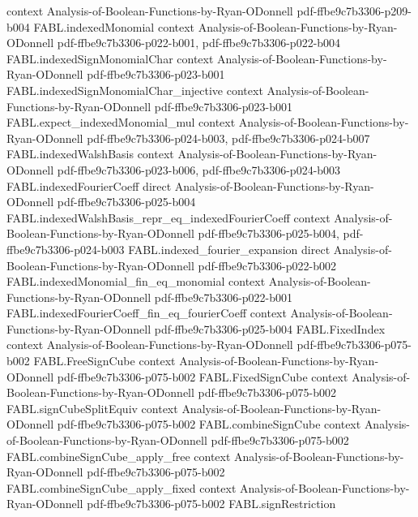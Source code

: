 \begin{theorem}
  {context}
  {Analysis-of-Boolean-Functions-by-Ryan-ODonnell}
  {pdf-ffbe9c7b3306-p209-b004}
\proofstep
  {FABL.indexedMonomial}
  {context}
  {Analysis-of-Boolean-Functions-by-Ryan-ODonnell}
  {pdf-ffbe9c7b3306-p022-b001,
    pdf-ffbe9c7b3306-p022-b004}
\proofstep
  {FABL.indexedSignMonomialChar}
  {context}
  {Analysis-of-Boolean-Functions-by-Ryan-ODonnell}
  {pdf-ffbe9c7b3306-p023-b001}
\proofstep
  {FABL.indexedSignMonomialChar_injective}
  {context}
  {Analysis-of-Boolean-Functions-by-Ryan-ODonnell}
  {pdf-ffbe9c7b3306-p023-b001}
\proofstep
  {FABL.expect_indexedMonomial_mul}
  {context}
  {Analysis-of-Boolean-Functions-by-Ryan-ODonnell}
  {pdf-ffbe9c7b3306-p024-b003,
    pdf-ffbe9c7b3306-p024-b007}
\proofstep
  {FABL.indexedWalshBasis}
  {context}
  {Analysis-of-Boolean-Functions-by-Ryan-ODonnell}
  {pdf-ffbe9c7b3306-p023-b006,
    pdf-ffbe9c7b3306-p024-b003}
\proofstep
  {FABL.indexedFourierCoeff}
  {direct}
  {Analysis-of-Boolean-Functions-by-Ryan-ODonnell}
  {pdf-ffbe9c7b3306-p025-b004}
\proofstep
  {FABL.indexedWalshBasis_repr_eq_indexedFourierCoeff}
  {context}
  {Analysis-of-Boolean-Functions-by-Ryan-ODonnell}
  {pdf-ffbe9c7b3306-p025-b004,
    pdf-ffbe9c7b3306-p024-b003}
\proofstep
  {FABL.indexed_fourier_expansion}
  {direct}
  {Analysis-of-Boolean-Functions-by-Ryan-ODonnell}
  {pdf-ffbe9c7b3306-p022-b002}
\proofstep
  {FABL.indexedMonomial_fin_eq_monomial}
  {context}
  {Analysis-of-Boolean-Functions-by-Ryan-ODonnell}
  {pdf-ffbe9c7b3306-p022-b001}
\proofstep
  {FABL.indexedFourierCoeff_fin_eq_fourierCoeff}
  {context}
  {Analysis-of-Boolean-Functions-by-Ryan-ODonnell}
  {pdf-ffbe9c7b3306-p025-b004}
\proofstep
  {FABL.FixedIndex}
  {context}
  {Analysis-of-Boolean-Functions-by-Ryan-ODonnell}
  {pdf-ffbe9c7b3306-p075-b002}
\proofstep
  {FABL.FreeSignCube}
  {context}
  {Analysis-of-Boolean-Functions-by-Ryan-ODonnell}
  {pdf-ffbe9c7b3306-p075-b002}
\proofstep
  {FABL.FixedSignCube}
  {context}
  {Analysis-of-Boolean-Functions-by-Ryan-ODonnell}
  {pdf-ffbe9c7b3306-p075-b002}
\proofstep
  {FABL.signCubeSplitEquiv}
  {context}
  {Analysis-of-Boolean-Functions-by-Ryan-ODonnell}
  {pdf-ffbe9c7b3306-p075-b002}
\proofstep
  {FABL.combineSignCube}
  {context}
  {Analysis-of-Boolean-Functions-by-Ryan-ODonnell}
  {pdf-ffbe9c7b3306-p075-b002}
\proofstep
  {FABL.combineSignCube_apply_free}
  {context}
  {Analysis-of-Boolean-Functions-by-Ryan-ODonnell}
  {pdf-ffbe9c7b3306-p075-b002}
\proofstep
  {FABL.combineSignCube_apply_fixed}
  {context}
  {Analysis-of-Boolean-Functions-by-Ryan-ODonnell}
  {pdf-ffbe9c7b3306-p075-b002}
\proofstep
  {FABL.signRestriction}

\end{theorem}

